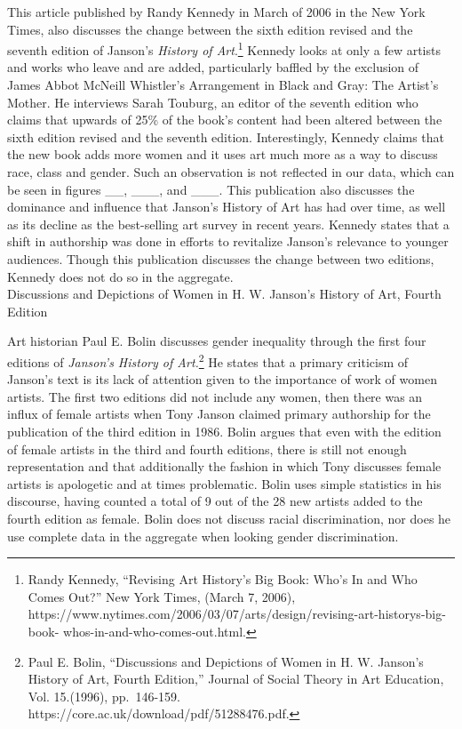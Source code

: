 \documentclass[
  letterpaper,
  DIV=11,
  numbers=noendperiod]{scrreprt}
\begin{document}
This article published by Randy Kennedy in March of 2006 in the New York
Times, also discusses the change between the sixth edition revised and
the seventh edition of Janson's \emph{History of Art}.\footnote{Randy
  Kennedy, ``Revising Art History's Big Book: Who's In and Who Comes
  Out?'' New York Times, (March 7, 2006),
  https://www.nytimes.com/2006/03/07/arts/design/revising-art-historys-big-book-
  whos-in-and-who-comes-out.html.} Kennedy looks at only a few artists
and works who leave and are added, particularly baffled by the exclusion
of James Abbot McNeill Whistler's Arrangement in Black and Gray: The
Artist's Mother. He interviews Sarah Touburg, an editor of the seventh
edition who claims that upwards of 25\% of the book's content had been
altered between the sixth edition revised and the seventh edition.
Interestingly, Kennedy claims that the new book adds more women and it
uses art much more as a way to discuss race, class and gender. Such an
observation is not reflected in our data, which can be seen in figures
\_\_, \_\_\_, and \_\_\_. This publication also discusses the dominance
and influence that Janson's History of Art has had over time, as well as
its decline as the best-selling art survey in recent years. Kennedy
states that a shift in authorship was done in efforts to revitalize
Janson's relevance to younger audiences. Though this publication
discusses the change between two editions, Kennedy does not do so in the
aggregate.\\

Discussions and Depictions of Women in H. W. Janson's History of Art,
Fourth Edition

Art historian Paul E. Bolin discusses gender inequality through the
first four editions of \emph{Janson's History of Art.}\footnote{Paul E.
  Bolin, ``Discussions and Depictions of Women in H. W. Janson's History
  of Art, Fourth Edition,'' Journal of Social Theory in Art Education,
  Vol. 15.(1996), pp.~146-159.
  https://core.ac.uk/download/pdf/51288476.pdf.} He states that a
primary criticism of Janson's text is its lack of attention given to the
importance of work of women artists. The first two editions did not
include any women, then there was an influx of female artists when Tony
Janson claimed primary authorship for the publication of the third
edition in 1986. Bolin argues that even with the edition of female
artists in the third and fourth editions, there is still not enough
representation and that additionally the fashion in which Tony discusses
female artists is apologetic and at times problematic. Bolin uses simple
statistics in his discourse, having counted a total of 9 out of the 28
new artists added to the fourth edition as female. Bolin does not
discuss racial discrimination, nor does he use complete data in the
aggregate when looking gender discrimination.
\end{document}
